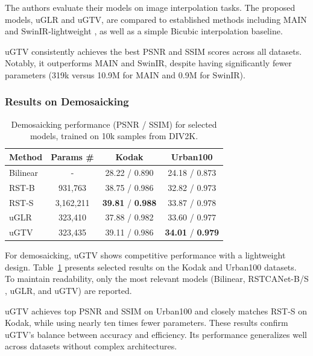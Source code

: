 \documentclass{article}
\theoremstyle{plain}
\theoremstyle{definition}
\theoremstyle{remark}
\begin{document}
The authors evaluate their models on image interpolation tasks. The proposed models, uGLR and uGTV, are compared to established methods including MAIN \cite{ji2020image} and SwinIR-lightweight \cite{liang2021swinir}, as well as a simple Bicubic interpolation baseline.

uGTV consistently achieves the best PSNR and SSIM scores across all datasets. Notably, it outperforms MAIN and SwinIR, despite having significantly fewer parameters (319k versus 10.9M for MAIN and 0.9M for SwinIR).

\subsubsection{Results on Demosaicking}

\begin{table}[b]
\vskip -0.3in
\caption{Demosaicking performance (PSNR / SSIM) for selected models, trained on 10k samples from DIV2K.}
\label{tab:demosaicking_selected}
\begin{center}
\begin{small}
\begin{sc}
\begin{tabular}{lccc}
\toprule
\textbf{Method} & \textbf{Params \#} & \textbf{Kodak} & \textbf{Urban100} \\
\midrule
Bilinear  & -        &  28.22 / 0.890 & 24.18 / 0.873 \\
RST-B & 931,763   &  38.75 / 0.986 & 32.82 / 0.973 \\
RST-S & 3,162,211 &  \textbf{39.81} / \textbf{0.988} & 33.87 / 0.978 \\
uGLR  & 323,410   &  37.88 / 0.982 & 33.60 / 0.977 \\
uGTV  & 323,435   &  39.11 / 0.986 & \textbf{34.01} / \textbf{0.979} \\
\bottomrule
\end{tabular}
\end{sc}
\end{small}
\end{center}
\vskip -0.2in
\end{table}

For demosaicking, uGTV shows competitive performance with a lightweight design. Table~\ref{tab:demosaicking_selected} presents selected results on the Kodak and Urban100 datasets. To maintain readability, only the most relevant models (Bilinear, RSTCANet-B/S \cite{xing2022residual}, uGLR, and uGTV) are reported.

uGTV achieves top PSNR and SSIM on Urban100 and closely matches RST-S on Kodak, while using nearly ten times fewer parameters. These results confirm uGTV’s balance between accuracy and efficiency. Its performance generalizes well across datasets without complex architectures.
\end{document}
